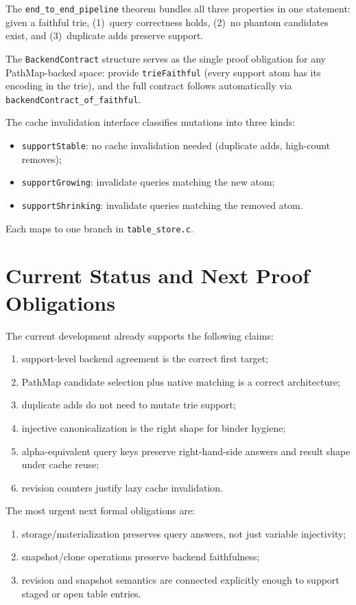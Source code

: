 \documentclass[11pt]{article}
\newcommand{\PathMap}{\textup{PathMap}}
\begin{document}
The \texttt{end\_to\_end\_pipeline} theorem bundles all three properties in
one statement: given a faithful trie, (1)~query correctness holds,
(2)~no phantom candidates exist, and (3)~duplicate adds preserve support.

The \texttt{BackendContract} structure serves as the single proof obligation
for any \PathMap{}-backed space: provide \texttt{trieFaithful} (every
support atom has its encoding in the trie), and the full contract follows
automatically via \texttt{backendContract\_of\_faithful}.

The cache invalidation interface classifies mutations into three kinds:
\begin{itemize}
\item \texttt{supportStable}: no cache invalidation needed (duplicate adds,
  high-count removes);
\item \texttt{supportGrowing}: invalidate queries matching the new atom;
\item \texttt{supportShrinking}: invalidate queries matching the removed atom.
\end{itemize}

\noindent
Each maps to one branch in \texttt{table\_store.c}.

\section{Current Status and Next Proof Obligations}

The current development already supports the following claims:
\begin{enumerate}
\item support-level backend agreement is the correct first target;
\item \PathMap{} candidate selection plus native matching is a correct
  architecture;
\item duplicate adds do not need to mutate trie support;
\item injective canonicalization is the right shape for binder hygiene;
\item alpha-equivalent query keys preserve right-hand-side answers and
  result shape under cache reuse;
\item revision counters justify lazy cache invalidation.
\end{enumerate}

The most urgent next formal obligations are:
\begin{enumerate}
\item storage/materialization preserves query answers, not just variable
  injectivity;
\item snapshot/clone operations preserve backend faithfulness;
\item revision and snapshot semantics are connected explicitly enough to
  support staged or open table entries.
\end{enumerate}
\end{document}

